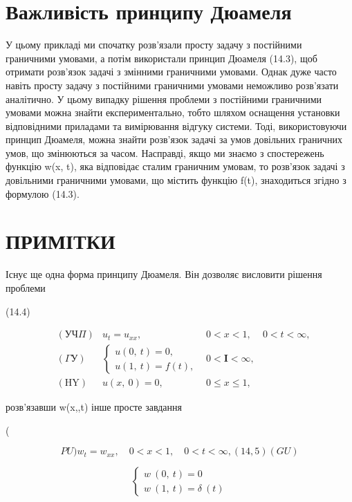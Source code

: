 \documentclass[
  ukrainian,
]{article}
\begin{document}
\section{Важливість принципу
Дюамеля}\label{ux432ux430ux436ux43bux438ux432ux456ux441ux442ux44c-ux43fux440ux438ux43dux446ux438ux43fux443-ux434ux44eux430ux43cux435ux43bux44f}

У цьому прикладі ми спочатку розв'язали просту задачу з постійними
граничними умовами, а потім використали принцип Дюамеля (14.3), щоб
отримати розв'язок задачі з змінними граничними умовами. Однак дуже
часто навіть просту задачу з постійними граничними умовами неможливо
розв'язати аналітично. У цьому випадку рішення проблеми з постійними
граничними умовами можна знайти експериментально, тобто шляхом оснащення
установки відповідними приладами та вимірювання відгуку системи. Тоді,
використовуючи принцип Дюамеля, можна знайти розв'язок задачі за умов
довільних граничних умов, що змінюються за часом. Насправді, якщо ми
знаємо з спостережень функцію w(x, t), яка відповідає сталим граничним
умовам, то розв'язок задачі з довільними граничними умовами, що містить
функцію f(t), знаходиться згідно з формулою (14.3).

\section{ПРИМІТКИ}\label{ux43fux440ux438ux43cux456ux442ux43aux438-3}

Існує ще одна форма принципу Дюамеля. Він дозволяє висловити рішення
проблеми

(14.4)

\[
\begin{aligned} & (\text{УЧ}\Pi) & u_t = u_{xx}, & 0 < x < 1, & 0 < t < \infty, \\ & \left( \Gamma \text{У} \right) & \begin{cases} u \left( 0, \ t \right) = 0, \\ u \left( 1, \ t \right) = f \left( t \right), \end{cases} & 0 < \textbf{I} < \infty, \\ & (\text{HY}) & u \left( x, \ 0 \right) = 0, & 0 \leqslant x \leqslant 1, \end{aligned}
\]

розв'язавши w\left(x,,t\right) інше просте завдання

(

\[
PU ) w_t=w_{xx}, \quad 0< x<1, \quad 0< t<\infty, ( 14,5 ) ( GU )
\]

\[
\begin{cases} w\ (0,\ t)=0 \\ w\ (1,\ t)=\delta\ (t) \end{cases}
\]
\end{document}
